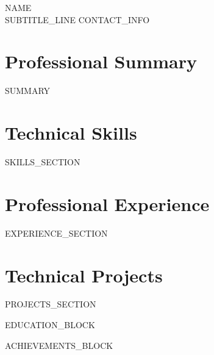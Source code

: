 \documentclass[10pt,a4paper]{article}
\begin{document}
\begin{center}
    {\Huge \scshape {{NAME}}} \\ \vspace{2pt}
    {{SUBTITLE_LINE}}
    \small {{CONTACT_INFO}}
\end{center}

\section{Professional Summary}
\small{
{{SUMMARY}}
}

\section{Technical Skills}
\begin{itemize}[leftmargin=0.15in, label={}]
    \small{\item{
{{SKILLS_SECTION}}
    }}
\end{itemize}

\section{Professional Experience}
{{EXPERIENCE_SECTION}}

\section{Technical Projects}
{{PROJECTS_SECTION}}

{{EDUCATION_BLOCK}}

{{ACHIEVEMENTS_BLOCK}}
\end{document}
